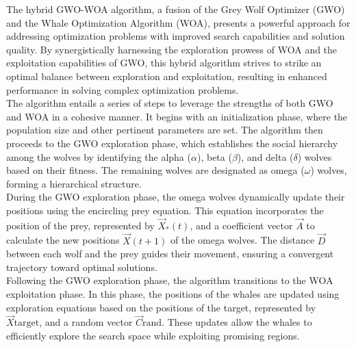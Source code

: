 \documentclass{article}
\begin{document}
The hybrid GWO-WOA algorithm, a fusion of the Grey Wolf Optimizer (GWO) and the Whale Optimization Algorithm (WOA), presents a powerful approach for addressing optimization problems with improved search capabilities and solution quality. By synergistically harnessing the exploration prowess of WOA and the exploitation capabilities of GWO, this hybrid algorithm strives to strike an optimal balance between exploration and exploitation, resulting in enhanced performance in solving complex optimization problems.\\

The algorithm entails a series of steps to leverage the strengths of both GWO and WOA in a cohesive manner. It begins with an initialization phase, where the population size and other pertinent parameters are set. The algorithm then proceeds to the GWO exploration phase, which establishes the social hierarchy among the wolves by identifying the alpha ($\alpha$), beta ($\beta$), and delta ($\delta$) wolves based on their fitness. The remaining wolves are designated as omega ($\omega$) wolves, forming a hierarchical structure.\\
During the GWO exploration phase, the omega wolves dynamically update their positions using the encircling prey equation. This equation incorporates the position of the prey, represented by $\overrightarrow{X}_*(t)$, and a coefficient vector $\overrightarrow{A}$ to calculate the new positions $\overrightarrow{X}(t+1)$ of the omega wolves. The distance $\overrightarrow{D}$ between each wolf and the prey guides their movement, ensuring a convergent trajectory toward optimal solutions.\\

Following the GWO exploration phase, the algorithm transitions to the WOA exploitation phase. In this phase, the positions of the whales are updated using exploration equations based on the positions of the target, represented by $\overrightarrow{X}{\text{target}}$, and a random vector $\overrightarrow{C}{\text{rand}}$. These updates allow the whales to efficiently explore the search space while exploiting promising regions.\\
\end{document}
